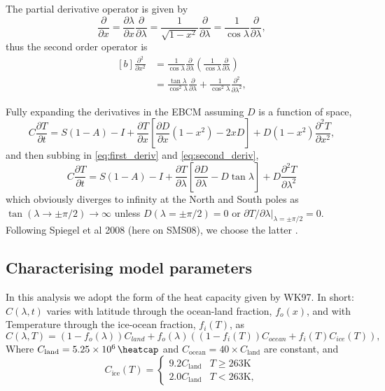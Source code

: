 \documentclass[12pt, onecolumn]{revtex4-2}    %
\begin{document}
The partial derivative operator is given by
\begin{equation}
    \frac{\partial}{\partial x} = \frac{\partial \lambda}{\partial x} \frac {\partial} {\partial \lambda}
    = \frac{1}{\sqrt{1-x^2}} \frac {\partial} {\partial \lambda}
    = \frac{1}{\cos \lambda} \frac {\partial} {\partial \lambda},
    \label{eq:first_deriv}
\end{equation}
thus the second order operator is
\begin{equation}
    \begin{aligned}[b]
        \frac{\partial^2}{\partial x^2} & = \frac{1}{\cos\lambda} \frac{\partial}{\partial \lambda} \left( \frac{1}{\cos\lambda} \frac{\partial}{\partial \lambda} \right)      \\
                                        & = \frac{\tan\lambda}{\cos^2\lambda}\frac{\partial}{\partial \lambda} + \frac{1}{\cos^2\lambda} \frac{\partial^2}{\partial \lambda^2},
    \end{aligned}
    \label{eq:second_deriv}
\end{equation}

Fully expanding the derivatives in the EBCM assuming $D$ is a function of space,
\begin{equation}
    C \frac{\partial T}{\partial t} = S(1-A) - I
    + \frac{\partial T}{\partial x}\left[\frac{\partial D}{\partial x}(1-x^2) - 2 x D\right]
    + D (1-x^2) \frac{\partial^2 T}{\partial x^2},
    \label{eq:expanded}
\end{equation}
and then subbing in \eqref{eq:first_deriv} and \eqref{eq:second_deriv},
\begin{equation}
    C \frac{\partial T}{\partial t} = S(1-A) - I
    + \frac{\partial T}{\partial \lambda}\left[\frac{\partial D}{\partial \lambda} - D \tan\lambda\right]
    + D \frac{\partial^2 T}{\partial \lambda^2}
    \label{eq:PDE_in_lat}
\end{equation}
which obviously diverges to infinity at the North and South poles as $\tan(\lambda \rightarrow \pm \pi/2) \rightarrow \infty$ unless $D(\lambda = \pm \pi/2) = 0$ or $\partial T / \partial \lambda|_{\lambda=\pm \pi/2} = 0$.
Following Spiegel et al 2008 (here on SMS08), we choose the latter \cite{SMS08}.

\subsection{Characterising model parameters} \label{sec:model_params}

In this analysis we adopt the form of the heat capacity given by WK97.
In short: $C(\lambda, t)$ varies with latitude through the ocean-land fraction, $f_o(x)$, and with Temperature through the ice-ocean fraction, $f_i(T)$, as
$$
    C(\lambda, T) = (1 - f_o(\lambda)) C_{land} + f_o(\lambda) ((1-f_i(T)) C_{ocean} + f_i(T) C_{ice}(T)),
$$
Where $C_{\text{land}} = \qty{5.25e6}{\heatcap}$ and $C_{\text{ocean}} = 40 \times C_{\text{land}}$ are constant, and
$$
    C_{\text{ice}}(T) =
    \begin{cases}
        9.2 C_\text{land} & T \ge 263\text{K} \\
        2.0 C_\text{land} & T < 263\text{K},
    \end{cases}
$$
\end{document}

